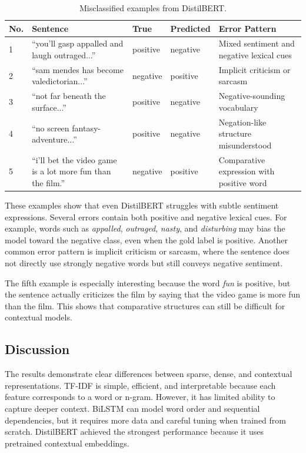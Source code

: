 \documentclass[11pt,a4paper]{article}
\begin{document}
\begin{table}[H]
\centering
\caption{Misclassified examples from DistilBERT.}
\begin{tabular}{p{0.6cm}p{7cm}p{1.8cm}p{2.1cm}p{3.5cm}}
\toprule
No. & Sentence & True & Predicted & Error Pattern \\
\midrule
1 & ``you'll gasp appalled and laugh outraged...'' & positive & negative & Mixed sentiment and negative lexical cues \\
2 & ``sam mendes has become valedictorian...'' & negative & positive & Implicit criticism or sarcasm \\
3 & ``not far beneath the surface...'' & positive & negative & Negative-sounding vocabulary \\
4 & ``no screen fantasy-adventure...'' & positive & negative & Negation-like structure misunderstood \\
5 & ``i'll bet the video game is a lot more fun than the film.'' & negative & positive & Comparative expression with positive word \\
\bottomrule
\end{tabular}
\end{table}

These examples show that even DistilBERT struggles with subtle sentiment expressions. Several errors contain both positive and negative lexical cues. For example, words such as \textit{appalled}, \textit{outraged}, \textit{nasty}, and \textit{disturbing} may bias the model toward the negative class, even when the gold label is positive. Another common error pattern is implicit criticism or sarcasm, where the sentence does not directly use strongly negative words but still conveys negative sentiment.

The fifth example is especially interesting because the word \textit{fun} is positive, but the sentence actually criticizes the film by saying that the video game is more fun than the film. This shows that comparative structures can still be difficult for contextual models.

\subsection{Discussion}

The results demonstrate clear differences between sparse, dense, and contextual representations. TF-IDF is simple, efficient, and interpretable because each feature corresponds to a word or n-gram. However, it has limited ability to capture deeper context. BiLSTM can model word order and sequential dependencies, but it requires more data and careful tuning when trained from scratch. DistilBERT achieved the strongest performance because it uses pretrained contextual embeddings.
\end{document}
